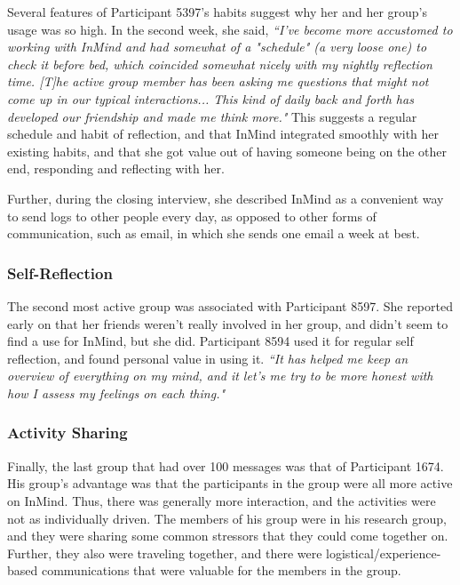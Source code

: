     Several features of Participant 5397's habits suggest why her and her group's
    usage was so high.
    In the second week, she said, 
    \textit{``I've become more accustomed to working with InMind and had somewhat
    of a "schedule" (a very loose one) to check it before bed,
    which coincided somewhat nicely with my nightly reflection time.
    [T]he active group member has been asking me questions that might not come up
    in our typical interactions...
    This kind of daily back and forth has developed our friendship
    and made me think more."}
    This suggests a regular schedule and habit of reflection,
    and that InMind integrated smoothly with her existing habits,
    and that she got value out of having someone being on the other end,
    responding and reflecting with her.

    Further, during the closing interview, she described InMind as a convenient
    way to send logs to other people every day,
    as opposed to other forms of communication, such as email, in which she sends
    one email a week at best.

    \subsubsection{Self-Reflection}
    The second most active group was associated with Participant 8597.
    She reported early on that her friends weren't really involved in her group,
    and didn't seem to find a use for InMind, but she did.
    Participant 8594 used it for regular self reflection,
    and found personal value in using it.
    \textit{``It has helped me keep an overview of everything on my mind,
    and it let's me try to be more honest with how I assess my feelings
    on each thing."}

    \subsubsection{Activity Sharing}
    Finally, the last group that had over 100 messages was that of
    Participant 1674.
    His group's advantage was that the participants in the group were all
    more active on InMind.
    Thus, there was generally more interaction,
    and the activities were not as individually driven.
    The members of his group were in his research group,
    and they were sharing some common stressors that they could come together on.
    Further, they also were traveling together,
    and there were logistical/experience-based communications that were
    valuable for the members in the group.

